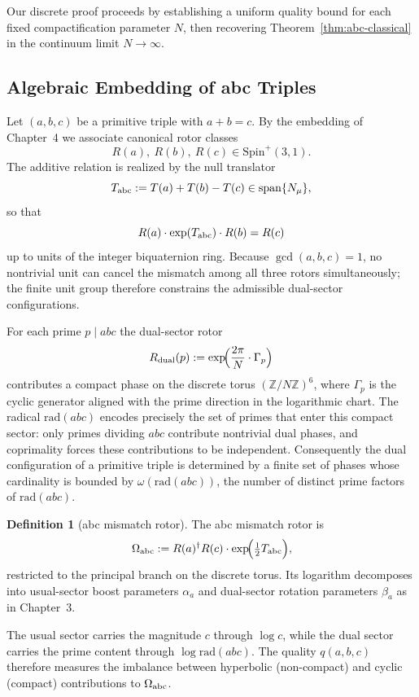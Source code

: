 \documentclass[dvipdfmx,a4paper]{article}
\theoremstyle{definition}
\newtheorem{definition}[theorem]{Definition}
\theoremstyle{remark}
\begin{document}
Our discrete proof proceeds by establishing a uniform quality bound for each fixed compactification parameter \( N \), then recovering Theorem~\ref{thm:abc-classical} in the continuum limit \( N \to \infty \).

\subsection{Algebraic Embedding of abc Triples}

Let \( (a,b,c) \) be a primitive triple with \( a + b = c \). By the embedding of Chapter~4 we associate canonical rotor classes
\[
R(a),\ R(b),\ R(c) \in \mathrm{Spin}^+(3,1).
\]
The additive relation is realized by the null translator
\[
T_{\rm abc} := T(a) + T(b) - T(c) \in \operatorname{span}\{N_\mu\},
\]
so that
\[
R(a) \cdot \exp(T_{\rm abc}) \cdot R(b) = R(c)
\]
up to units of the integer biquaternion ring. Because \( \gcd(a,b,c) = 1 \), no nontrivial unit can cancel the mismatch among all three rotors simultaneously; the finite unit group therefore constrains the admissible dual-sector configurations.

For each prime \( p \mid abc \) the dual-sector rotor
\[
R_{\rm dual}(p) := \exp\!\Bigl( \frac{2\pi}{N} \cdot \Gamma_p \Bigr)
\]
contributes a compact phase on the discrete torus \( (\mathbb{Z}/N\mathbb{Z})^6 \), where \( \Gamma_p \) is the cyclic generator aligned with the prime direction in the logarithmic chart. The radical \( \mathrm{rad}(abc) \) encodes precisely the set of primes that enter this compact sector: only primes dividing \( abc \) contribute nontrivial dual phases, and coprimality forces these contributions to be independent. Consequently the dual configuration of a primitive triple is determined by a finite set of phases whose cardinality is bounded by \( \omega(\mathrm{rad}(abc)) \), the number of distinct prime factors of \( \mathrm{rad}(abc) \).

\begin{definition}[abc mismatch rotor]
The abc mismatch rotor is
\[
\Omega_{\rm abc} := R(a)^\dagger R(c) \cdot \exp\!\Bigl( \tfrac12 T_{\rm abc} \Bigr),
\]
restricted to the principal branch on the discrete torus. Its logarithm decomposes into usual-sector boost parameters \( \alpha_a \) and dual-sector rotation parameters \( \beta_a \) as in Chapter~3.
\end{definition}

The usual sector carries the magnitude \( c \) through \( \log c \), while the dual sector carries the prime content through \( \log \mathrm{rad}(abc) \). The quality \( q(a,b,c) \) therefore measures the imbalance between hyperbolic (non-compact) and cyclic (compact) contributions to \( \Omega_{\rm abc} \).
\end{document}
